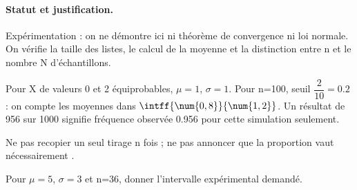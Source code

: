 \paragraph{Statut et justification.} Expérimentation : on ne démontre ici ni théorème de convergence ni loi normale. On vérifie la taille des listes, le calcul de la moyenne et la distinction entre n et le nombre N d’échantillons.
\begin{example}Pour X de valeurs 0 et 2 équiprobables, $\mu=1$, $\sigma=1$. Pour n=100, seuil $\dfrac{2}{10}=\num{0,2}$ : on compte les moyennes dans $\intff{\num{0,8}}{\num{1,2}}$. Un résultat de 956 sur 1000 signifie fréquence observée \num{0,956} pour cette simulation seulement.\end{example}\label{C08-EX5}
\begin{pitfall}Ne pas recopier un seul tirage n fois ; ne pas annoncer que la proportion vaut nécessairement .\end{pitfall}
\begin{application}Pour $\mu=5$, $\sigma=3$ et n=36, donner l’intervalle expérimental demandé.\end{application}\label{C08-AP5}
\mxnewpage
